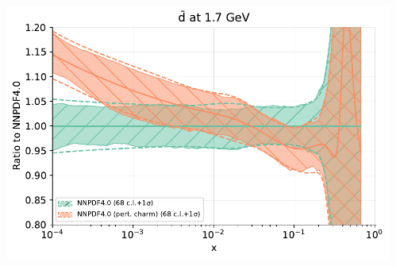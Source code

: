 \documentclass{beamer}
\begin{document}
\begin{frame}
\begin{columns}[c]
\begin{column}{0.5\textwidth}
  \end{column}
  \begin{column}{0.5\textwidth}
   \centering
   \includegraphics[width=\columnwidth]{plots/charm_3}\\
  \end{column}
 \end{columns}
\end{frame}
\end{document}
